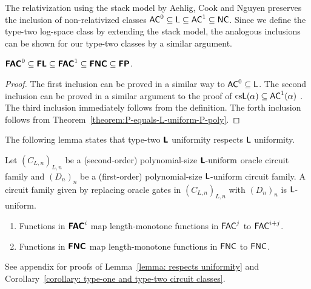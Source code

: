 \documentclass[envcountsame,orivec,oribibl]{llncs}
\begin{document}
The relativization using the stack model by Aehlig, Cook and Nguyen preserves
the inclusion of non-relativized classes
$\mathsf{AC}^0 \subseteq \mathsf{L} \subseteq \mathsf{AC}^1 \subseteq \mathsf{NC}$.
Since we define the type-two log-space class by extending the stack model,
the analogous inclusions can be shown for our type-two classes
by a similar argument. 

\begin{theorem}
\label{theorem:inclusion}
$ \text{\bfseries \sffamily \upshape FAC}^0
 \subseteq \text{\bfseries \sffamily \upshape FL} 
 \subseteq \text{\bfseries \sffamily \upshape FAC}^1
 \subseteq \text{\bfseries \sffamily \upshape FNC}
 \subseteq \text{\bfseries \sffamily \upshape FP}$. 
\end{theorem}

\begin{proof}
 The first inclusion can be proved in a similar way
 to $\mathsf{AC}^0 \subseteq \mathsf{L}$.
 The second inclusion can be proved in a similar argument to 
 the proof of $\text{cs}\mathsf{L}(\alpha) \subseteq \mathsf{AC}^1(\alpha)$
 \cite{aehlig2007relativizing}.
 The third inclusion immediately follows from the definition.
 The forth inclusion follows from Theorem~\ref{theorem:P-equals-L-uniform-P-poly}.
\end{proof}


The following lemma states that type-two $\text{\bfseries \sffamily \upshape L}$ uniformity respects
$\mathsf{L}$ uniformity.

\begin{lemma}
\label{lemma: respects uniformity}
 Let $(C_{L,n})_{L,n}$ be a (second-order) polynomial-size $\text{\bfseries \sffamily \upshape L}\text{-uniform}$ oracle circuit family
 and $(D_n)_n$ be a (first-order) polynomial-size $\mathsf{L}$-uniform circuit family.
 A circuit family given by replacing oracle gates in $(C_{L,n})_{L,n}$ with
 $(D_n)_n$ is $\mathsf{L}$-uniform.
\end{lemma}

\begin{corollary}
\label{corollary: type-one and type-two circuit classes}
\begin{enumerate}
 \item Functions in $\text{\bfseries \sffamily \upshape FAC}^i$ 
       map length-monotone functions in $\mathsf{FAC}^j$ 
       to $\mathsf{FAC}^{i+j}$.
 \item Functions in $\text{\bfseries \sffamily \upshape FNC}$
       map length-monotone functions in $\mathsf{FNC}$ 
       to $\mathsf{FNC}$.
\end{enumerate}
\end{corollary}

See appendix for proofs of 
Lemma~\ref{lemma: respects uniformity} and 
Corollary~\ref{corollary: type-one and type-two circuit classes}.
\end{document}
